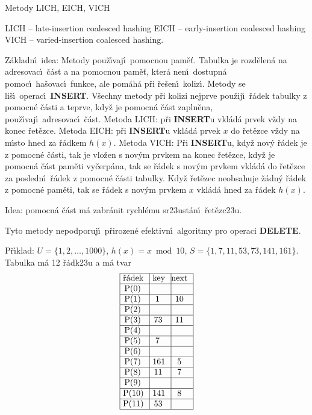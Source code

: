 \documentclass[a4paper,12pt]{article}
\begin{document}
\subhead
Metody LICH, EICH, VICH
\endsubhead

\phantom{---}LICH -- late-insertion coalesced hashing\newline 
\phantom{---}EICH -- early-insertion coalesced hashing\newline 
\phantom{---}VICH -- varied-insertion coalesced hashing.
\medskip

\flushpar Z\'akladn\'\i\ idea: Metody pou\v z\'\i vaj\'\i\ pomocnou pam\v e\v t. 
Tabulka je rozd\v elen\'a na adresovac\'\i\ \v c\'ast a na pomocnou 
pam\v e\v t, kter\'a nen\'\i\ dostupn\'a pomoc\'\i\ ha\v sovac\'\i\ funkce, 
ale pom\'ah\'a p\v ri \v re\v sen\'\i\ koliz\'\i . Metody se li\v s\'\i\ operac\'\i\ 
{\bf INSERT}. V\v sechny metody p\v ri kolizi nejprve pou\v zij\'\i\ \v r\'adek 
tabulky z pomocn\'e \v c\'asti a teprve, kdy\v z je pomocn\'a \v c\'ast 
zapln\v ena, pou\v z\'\i vaj\'\i\ adresovac\'\i\ \v c\'ast.\newline 
Metoda LICH: p\v ri {\bf INSERT}u vkl\'ad\'a prvek v\v zdy na konec 
\v re\-t\v ez\-ce.\newline 
Metoda EICH: p\v ri {\bf INSERT}u vkl\'ad\'a prvek $x$ do \v ret\v ezce v\v zdy 
na m\'\i sto hned za \v r\'adkem $h(x)$.\newline 
Metoda VICH: P\v ri {\bf INSERT}u, kdy\v z nov\'y \v r\'adek je z 
pomocn\'e \v c\'asti, tak je vlo\v zen s nov\'ym prvkem na konec 
\v ret\v ezce, kdy\v z je pomocn\'a \v c\'ast pam\v eti vy\v cer\-p\'a\-na, tak se 
\v r\'adek s nov\'ym prvkem vkl\'ad\'a do \v ret\v ezce za posled\-n\'\i\ 
\v r\'adek z pomocn\'e \v c\'asti tabulky. Kdy\v z \v ret\v ezec neobsahuje 
\v z\'adn\'y \v r\'adek z pomocn\'e pam\v eti, tak se \v r\'adek s nov\'ym  prvkem $
x$ vkl\'ad\'a hned za \v r\'adek $h(x)$. 
\medskip

\flushpar Idea: pomocn\'a \v c\'ast m\'a zabr\'anit rychl\'emu 
sr\accent23ust\'an\'\i\ \v ret\v ezc\accent23u.
\medskip

\flushpar Tyto metody nepodporuj\'\i\ p\v rirozen\'e efektivn\'\i\ algoritmy 
pro ope\-raci {\bf DELETE}.

\flushpar P\v r\'\i klad: $U=\{1,2,\dots,1000\}$, $h(x)=x\bmod10$,\newline 
$S=\{1,7,11,53,73,141,161\}$. Tabulka m\'a 12 \v r\'adk\accent23u a 
m\'a tvar
$$\vtop{\offinterlineskip\halign {\strut\vrule\ # & \vrule\ # & \vrule \hfil # \hfil \vrule\cr\noalign{\hrule}\v r\'adek & key & next \hfil \cr\noalign{\hrule}P(0) & &\hfill \cr\noalign{\hrule}P(1) & 1 & 10 \cr\noalign{\hrule}P(2) & &\hfill \cr\noalign{\hrule}P(3) & 73 & 11 \cr\noalign{\hrule}P(4) &  &\hfill \cr\noalign{\hrule}P(5) & 7 & \hfill \cr\noalign{\hrule}P(6) & &\hfill \cr\noalign{\hrule}P(7) & 161 & 5 \cr\noalign{\hrule}P(8) & 11 & 7 \cr\noalign{\hrule}P(9) & &\hfill \cr\noalign{\hrule}\noalign{\hrule}P(10) & 141 & 8 \cr\noalign{\hrule}P(11) & 53 & \cr\noalign{\hrule}}}$$
\end{document}
